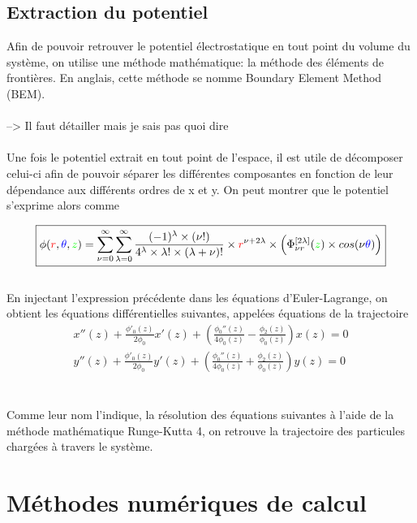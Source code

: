 \documentclass[a4paper]{article} %
\begin{document}
\subsection{Extraction du potentiel}
Afin de pouvoir retrouver le potentiel électrostatique en tout point du volume du système, on utilise une 
méthode mathématique: la méthode des éléments de frontières. En anglais, cette méthode se nomme Boundary 
Element Method (BEM). 
\\
\\
{\color{red}
--> Il faut détailler mais je sais pas quoi dire }
\\
\\
Une fois le potentiel extrait en tout point de l'espace, il est utile de décomposer celui-ci afin de pouvoir séparer les 
différentes composantes en fonction de leur dépendance aux différents ordres de x et y. On peut montrer que le potentiel s'exprime 
alors comme 

\begin{equation}
\begin{aligned}
\boxed{
\phi ({\color{red}r},{\color{blue}\theta},{\color{green}z})= \sum\limits_{\nu =0}^{\infty}
\sum\limits_{\lambda=0}^{\infty} \frac{(-1)^{\lambda}\times (\nu !)}{4^{\lambda}\times \lambda !\times (\lambda +\nu)!}
\times {\color{red}r}^{\nu +2\lambda} \times \left(\Phi_{\nu {r}}^{[2\lambda]}({\color{green}z})\times cos(\nu{\color{blue}\theta}) \right)}
\end{aligned}
\end{equation}
\\
En injectant l'expression précédente dans les équations d'Euler-Lagrange, on obtient les équations différentielles suivantes, appelées équations de la trajectoire
\begin{equation}
\begin{aligned}
x''(z) + \frac{\phi'_0(z)}{2\phi_0}x'(z) + \left( \frac{\phi_0''(z)}{4\phi_0(z)} -
\frac{\phi_2(z)}{\phi_0(z)}\right) x(z) = 0 \\
y''(z) + \frac{\phi'_0(z)}{2\phi_0}y'(z) + \left(\frac{\phi_0''(z)}{4\phi_0(z)} +
\frac{\phi_2(z)}{\phi_0(z)}\right) y(z) = 0
\end{aligned}
\end{equation}
\\
\\
Comme leur nom l'indique, la  résolution des équations suivantes à l'aide de la méthode mathématique Runge-Kutta 4, on retrouve la trajectoire des 
particules chargées à travers le système. 
\section{Méthodes numériques de calcul}
\end{document}
